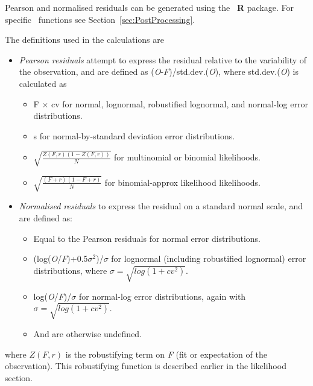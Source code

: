 Pearson and normalised residuals can be generated using the \CNAME\ \textbf{R} package. For specific \R\ functions see Section~\ref{sec:PostProcessing}.

The definitions used in the calculations are

\begin{itemize}
	\item \textit{Pearson residuals} attempt to express the residual relative to the variability of the observation, and are defined as (\textit{O}-\textit{F})/std.dev.(\textit{O}), where std.dev.(\textit{O}) is calculated as
	\begin{itemize}
			\item F $\times$ cv for normal, lognormal, robustified lognormal, and normal-log error distributions.
			\item s for normal-by-standard deviation error distributions.
			\item $\sqrt{\frac{Z(\textit{F},r)(1 - Z(\textit{F},r))}{N}}$ for multinomial or binomial likelihoods.
			\item $\sqrt{\frac{(\textit{F} + r)(1 - \textit{F} + r)}{N}}$ for binomial-approx likelihood likelihoods.
	\end{itemize}
	\item \textit{Normalised residuals} to express the residual on a standard normal scale, and are defined as:
	\begin{itemize}
		\item Equal to the Pearson residuals for normal error distributions.
		\item (log(\textit{O}/\textit{F})+0.5$\sigma^2$)/$\sigma$ for lognormal (including robustified lognormal) error distributions, where $\sigma= \sqrt{log(1 + cv^2)}$.
		\item  log(\textit{O}/\textit{F})/$\sigma$ for normal-log error distributions, again with $\sigma= \sqrt{log(1 + cv^2)}$.
		\item And are otherwise undefined.
	\end{itemize}
\end{itemize}

where $Z(\textit{F},r)$ is the robustifying term on \textit{F} (fit or expectation of the observation). This robustifying function is described earlier in the likelihood section.


